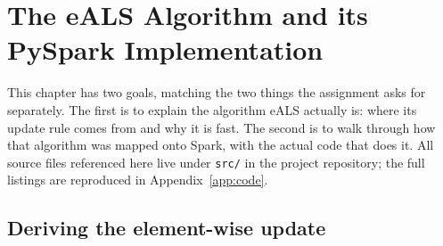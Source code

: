 \chapter{The eALS Algorithm and its PySpark Implementation}
\label{ch:methods}

This chapter has two goals, matching the two things the assignment asks
for separately. The first is to explain the algorithm eALS actually is:
where its update rule comes from and why it is fast. The second is to walk
through how that algorithm was mapped onto Spark, with the actual code that
does it. All source files referenced here live under \texttt{src/} in the
project repository; the full listings are reproduced in
Appendix~\ref{app:code}.

\section{Deriving the element-wise update}
\label{sec:ealsdesign}

